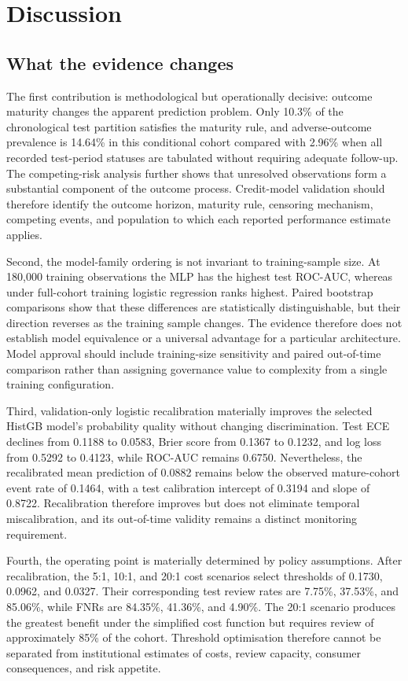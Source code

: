 \documentclass[10pt]{article}
\begin{document}
\section{Discussion}

\subsection{What the evidence changes}

The first contribution is methodological but operationally decisive: outcome maturity changes the apparent prediction problem. Only 10.3\% of the chronological test partition satisfies the maturity rule, and adverse-outcome prevalence is 14.64\% in this conditional cohort compared with 2.96\% when all recorded test-period statuses are tabulated without requiring adequate follow-up. The competing-risk analysis further shows that unresolved observations form a substantial component of the outcome process. Credit-model validation should therefore identify the outcome horizon, maturity rule, censoring mechanism, competing events, and population to which each reported performance estimate applies.

Second, the model-family ordering is not invariant to training-sample size. At 180,000 training observations the MLP has the highest test ROC-AUC, whereas under full-cohort training logistic regression ranks highest. Paired bootstrap comparisons show that these differences are statistically distinguishable, but their direction reverses as the training sample changes. The evidence therefore does not establish model equivalence or a universal advantage for a particular architecture. Model approval should include training-size sensitivity and paired out-of-time comparison rather than assigning governance value to complexity from a single training configuration.

Third, validation-only logistic recalibration materially improves the selected HistGB model's probability quality without changing discrimination. Test ECE declines from 0.1188 to 0.0583, Brier score from 0.1367 to 0.1232, and log loss from 0.5292 to 0.4123, while ROC-AUC remains 0.6750. Nevertheless, the recalibrated mean prediction of 0.0882 remains below the observed mature-cohort event rate of 0.1464, with a test calibration intercept of 0.3194 and slope of 0.8722. Recalibration therefore improves but does not eliminate temporal miscalibration, and its out-of-time validity remains a distinct monitoring requirement.

Fourth, the operating point is materially determined by policy assumptions. After recalibration, the 5:1, 10:1, and 20:1 cost scenarios select thresholds of 0.1730, 0.0962, and 0.0327. Their corresponding test review rates are 7.75\%, 37.53\%, and 85.06\%, while FNRs are 84.35\%, 41.36\%, and 4.90\%. The 20:1 scenario produces the greatest benefit under the simplified cost function but requires review of approximately 85\% of the cohort. Threshold optimisation therefore cannot be separated from institutional estimates of costs, review capacity, consumer consequences, and risk appetite.
\end{document}
